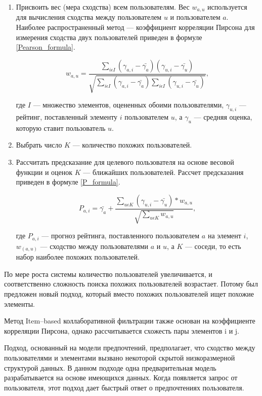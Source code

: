 \begin{enumerate}
	\item Присвоить вес (мера сходства) всем пользователям. Вес $w_{a, u}$ используется для вычисления сходства между пользователем $u$ и пользователем $a$. Наиболее распространенный метод — коэффициент корреляции Пирсона для измерения сходства двух пользователей приведен в формуле \ref{Pearson_formula}.
	
	\begin{equation}
	\label{Pearson_formula}
	w_{a, u} = \frac{\sum_{i\epsilon I}(\gamma_{a, i} - \bar{\gamma_a})(\gamma_{u, i} - \bar{\gamma_u})}{\sqrt{\sum_{i\epsilon I}(\gamma_{a, i} - \bar{\gamma_a}){\sum_{i\epsilon I}(\gamma_{u, i} - \bar{\gamma_u})}}},
	\end{equation}
	
	где $I$ — множество элементов, оцененных обоими пользователями, $\gamma_{u, i}$ — рейтинг, поставленный элементу $i$ пользователем $u$, а $\gamma_{u}$ — средняя оценка, которую ставит пользователь $u$.
	\item Выбрать число $K$ — количество похожих пользователей.
	\item Рассчитать предсказание для целевого пользователя на основе весовой функции и оценок $K$ — ближайших пользователей. Рассчет предсказания приведен в формуле \ref{P_formula}.
	
	\begin{equation}
	\label{P_formula}
	P_{a, i} = \bar{\gamma_a} + \frac
	{\sum_{u \epsilon K}(\gamma_{u, i} - \bar{\gamma_u}) * w_{a, u}}
	{\sqrt{\sum_{u \epsilon K}w_{a, u}}},
	\end{equation}
	
	где $P_{a, i}$ — прогноз рейтинга, поставленного пользователем $a$ на элемент $i$, $w_(a,u)$ — сходство между пользователями $a$ и $u$, а $K$ — соседи, то есть набор наиболее похожих пользователей.
\end{enumerate}

По мере роста системы количество пользователей увеличивается, и соответственно сложность поиска похожих пользователей возрастает. Потому был предложен новый подход, который вместо похожих пользователей ищет похожие элементы.

Метод Item–based коллаборативной фильтрации также основан на коэффициенте корреляции Пирсона, однако рассчитывается схожесть пары элементов i и j.

Подход, основанный на модели предпочтений, предполагает, что сходство между пользователями и элементами вызвано некоторой скрытой низкоразмерной структурой данных. В данном подходе одна предварительная модель разрабатывается на основе имеющихся данных. Когда появляется запрос от пользователя, этот подход дает быстрый ответ о предпочтениях пользователя.

